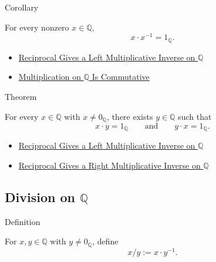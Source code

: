 \begin{corollarybox}{Corollary}
\begin{corollary}
\label{cor:reciprocal-right-multiplicative-inverse-on-q}
For every nonzero $x\in\mathbb{Q}$,
\[
x\cdot x^{-1}=1_{\mathbb{Q}}.
\]
\end{corollary}
\end{corollarybox}

\begin{dependencies}
\begin{itemize}
  \item \hyperref[thm:reciprocal-left-multiplicative-inverse-on-q]{Reciprocal Gives a Left Multiplicative Inverse on $\mathbb{Q}$}
  \item \hyperref[thm:multiplication-on-q-commutative]{Multiplication on $\mathbb{Q}$ Is Commutative}
\end{itemize}
\end{dependencies}

\begin{theorembox}{Theorem}
\begin{theorem}
\label{thm:every-nonzero-rational-has-multiplicative-inverse}
For every $x\in\mathbb{Q}$ with $x\ne 0_{\mathbb{Q}}$, there exists
$y\in\mathbb{Q}$ such that
\[
x\cdot y=1_{\mathbb{Q}}
\qquad\text{and}\qquad
y\cdot x=1_{\mathbb{Q}}.
\]
\end{theorem}
\end{theorembox}

\begin{dependencies}
\begin{itemize}
  \item \hyperref[thm:reciprocal-left-multiplicative-inverse-on-q]{Reciprocal Gives a Left Multiplicative Inverse on $\mathbb{Q}$}
  \item \hyperref[cor:reciprocal-right-multiplicative-inverse-on-q]{Reciprocal Gives a Right Multiplicative Inverse on $\mathbb{Q}$}
\end{itemize}
\end{dependencies}

\subsection*{Division on $\mathbb{Q}$}

\begin{definitionbox}{Definition}
\begin{definition}
\label{def:division-on-q}
For $x,y\in\mathbb{Q}$ with $y\ne 0_{\mathbb{Q}}$, define
\[
x/y:=x\cdot y^{-1}.
\]
\end{definition}
\end{definitionbox}

